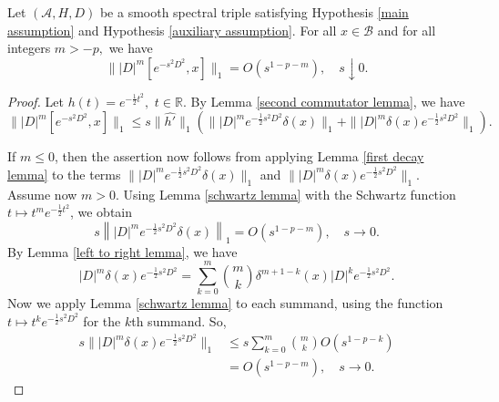     \begin{lem}\label{commutator 6} 
        Let $(\mathcal{A},H,D)$ be a smooth spectral triple satisfying Hypothesis \ref{main assumption} and Hypothesis \ref{auxiliary assumption}. For all $x\in\mathcal{B}$ and for all integers $m>-p,$ we have
        \begin{equation*}
            \||D|^m[e^{-s^2D^2},x]\|_1=O(s^{1-p-m}),\quad s\downarrow0.
        \end{equation*}
    \end{lem}
    \begin{proof} 
        Let $h(t)=e^{-\frac{1}{2}t^2},$ $t\in\mathbb{R}.$ By Lemma \ref{second commutator lemma}, we have
        \begin{equation*}
            \||D|^m[e^{-s^2D^2},x]\|_1 \leq s\|\widehat{h'}\|_1(\||D|^me^{-\frac12s^2D^2}\delta(x)\|_1+\||D|^m\delta(x)e^{-\frac12s^2D^2}\|_1).
        \end{equation*}
        
        If $m \leq 0$, then the assertion now follows from applying Lemma \ref{first decay lemma} to the terms $\||D|^me^{-\frac{1}{2}s^2D^2}\delta(x)\|_1$ and $\||D|^m\delta(x)e^{-\frac{1}{2}s^2D^2}\|_1$.        
        Assume now $m > 0$. Using Lemma \ref{schwartz lemma} with the Schwartz function $t\mapsto t^me^{-\frac{1}{2}t^2}$, we obtain
        \begin{equation*}
            s\left\||D|^me^{-\frac{1}{2}s^2D^2}\delta(x)\right\|_1 = O(s^{1-p-m}),\quad s\to 0.
        \end{equation*}
        By Lemma \ref{left to right lemma}, we have
        \begin{equation*}
            |D|^m\delta(x)e^{-\frac{1}{2}s^2D^2} = \sum_{k=0}^m \binom{m}{k}\delta^{m+1-k}(x)|D|^ke^{-\frac{1}{2}s^2D^2}.
        \end{equation*}
        Now we apply Lemma \ref{schwartz lemma} to each summand, using the function $t\mapsto t^ke^{-\frac{1}{2}s^2D^2}$ for the $k$th summand.
        So,
        \begin{align*}
            s\||D|^m\delta(x)e^{-\frac{1}{2}s^2D^2}\|_1 &\leq s\sum_{k=0}^m \binom{m}{k}O(s^{1-p-k})\\
                                                        &= O(s^{1-p-m}), \quad s\to 0.
        \end{align*}
    \end{proof}
    
